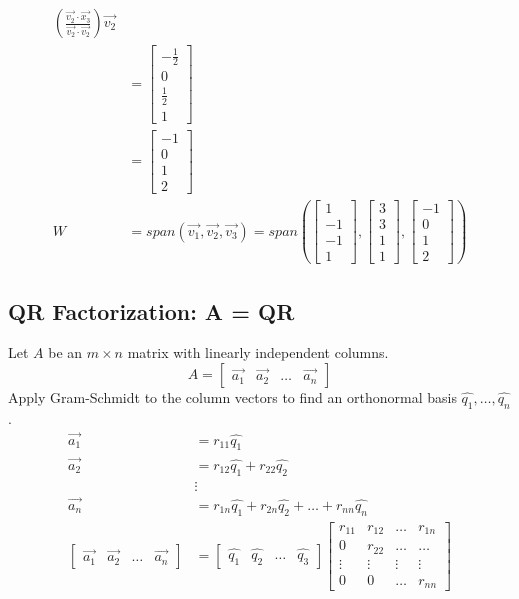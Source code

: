 \documentclass{math}
\begin{document}
\begin{align*}
    \left(\frac{\vec{v_2}\cdot\vec{x_3}}
    {\vec{v_2}\cdot\vec{v_2}}\right)\vec{v_2} \\
  &= \begin{bmatrix}-\frac{1}{2} \\ 0 \\ \frac{1}{2} \\ 1\end{bmatrix} \\
  &= \begin{bmatrix}-1 \\ 0 \\ 1 \\ 2\end{bmatrix} \\
  W &= span(\vec{v_1},\vec{v_2},\vec{v_3}) = span\left(
    \begin{bmatrix}1 \\ -1 \\ -1 \\ 1\end{bmatrix},
    \begin{bmatrix}3 \\ 3 \\ 1 \\ 1\end{bmatrix},
    \begin{bmatrix}-1 \\ 0 \\ 1 \\ 2\end{bmatrix}
  \right)
\end{align*}

\subsection*{QR Factorization: A = QR}
Let \( A \) be an \( m\times n \) matrix with linearly independent columns.
\[ A = \begin{bmatrix}\vec{a_1} & \vec{a_2} & \dots & \vec{a_n}\end{bmatrix} \]
Apply Gram-Schmidt to the column vectors to find an orthonormal basis
\( \hat{q_1},\dots,\hat{q_n} \).
\begin{align*}
  \vec{a_1} &= r_{11}\hat{q_1} \\
  \vec{a_2} &= r_{12}\hat{q_1}+r_{22}\hat{q_2} \\
  & \vdots \\
  \vec{a_n} &= r_{1n}\hat{q_1}+r_{2n}\hat{q_2}+\dots+r_{nn}\hat{q_n} \\
  \begin{bmatrix}\vec{a_1} & \vec{a_2} & \dots & \vec{a_n}\end{bmatrix} &=
    \begin{bmatrix}\hat{q_1} & \hat{q_2} & \dots & \hat{q_3}\end{bmatrix}
    \begin{bmatrix}
      r_{11} & r_{12} & \dots & r_{1n} \\
      0 & r_{22} & \dots & \dots \\
      \vdots & \vdots & \vdots & \vdots \\
      0 & 0 & \dots & r_{nn}
    \end{bmatrix}
\end{align*}
\end{document}
